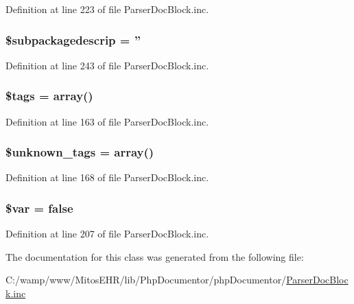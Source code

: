 \-Definition at line 223 of file \-Parser\-Doc\-Block.\-inc.

\hypertarget{classparser_doc_block_aa1463e644e853c16f24645313a4d7fd9}{
\subsubsection[{\$subpackagedescrip}]{\setlength{\rightskip}{0pt plus 5cm}\$subpackagedescrip = ''}}\label{classparser_doc_block_aa1463e644e853c16f24645313a4d7fd9}


\-Definition at line 243 of file \-Parser\-Doc\-Block.\-inc.

\hypertarget{classparser_doc_block_a475a6a63b85186663d34151bcbd21590}{
\subsubsection[{\$tags}]{\setlength{\rightskip}{0pt plus 5cm}\$tags = array()}}\label{classparser_doc_block_a475a6a63b85186663d34151bcbd21590}


\-Definition at line 163 of file \-Parser\-Doc\-Block.\-inc.

\hypertarget{classparser_doc_block_ae191ccaa06561b85353dce1c216fc48c}{
\subsubsection[{\$unknown\-\_\-tags}]{\setlength{\rightskip}{0pt plus 5cm}\$unknown\-\_\-tags = array()}}\label{classparser_doc_block_ae191ccaa06561b85353dce1c216fc48c}


\-Definition at line 168 of file \-Parser\-Doc\-Block.\-inc.

\hypertarget{classparser_doc_block_a9184c9cf1f1e58b87296500a3c3a9291}{
\subsubsection[{\$var}]{\setlength{\rightskip}{0pt plus 5cm}\$var = false}}\label{classparser_doc_block_a9184c9cf1f1e58b87296500a3c3a9291}


\-Definition at line 207 of file \-Parser\-Doc\-Block.\-inc.



\-The documentation for this class was generated from the following file\-:\begin{DoxyCompactItemize}
\item 
\-C\-:/wamp/www/\-Mitos\-E\-H\-R/lib/\-Php\-Documentor/php\-Documentor/\hyperlink{_parser_doc_block_8inc}{\-Parser\-Doc\-Block.\-inc}\end{DoxyCompactItemize}
